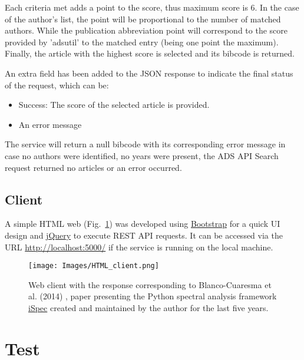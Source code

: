 \documentclass[a4paper,10pt,twoside]{article}
\begin{document}
Each criteria met adds a point to the score, thus maximum score is 6. In the case of the author's list, the point will be proportional to the number of matched authors. While the publication abbreviation point will correspond to the score provided by 'adsutil' to the matched entry (being one point the maximum). Finally, the article with the highest score is selected and its bibcode is returned.

An extra field has been added to the JSON response to indicate the final status of the request, which can be:

\begin{itemize}
	\item Success: The score of the selected article is provided.
	\item An error message
\end{itemize}

The service will return a null bibcode with its corresponding error message in case no authors were identified, no years were present, the ADS API Search request returned no articles or an error occurred.


\subsection{Client}
\label{sub:client}

A simple HTML web (Fig.~\ref{fig:web_client}) was developed using \href{https://getbootstrap.com/}{Bootstrap} for a quick UI design and \href{https://jquery.com/}{jQuery} to execute REST API requests. It can be accessed via the URL \href{http://localhost:5000/}{http://localhost:5000/} if the service is running on the local machine.

\begin{figure}[H]
    \begin{centering}
        \texttt{[image: Images/HTML\_client.png]}
        \par
    \end{centering}
    \caption{Web client with the response corresponding to Blanco-Cuaresma et al. (2014) \cite{2014A&A...569A.111B}, paper presenting the Python spectral analysis framework \href{http://www.blancocuaresma.com/s/}{iSpec} created and maintained by the author for the last five years.}
	\label{fig:web_client}
\end{figure}

\newpage
\section{Test}
\end{document}
